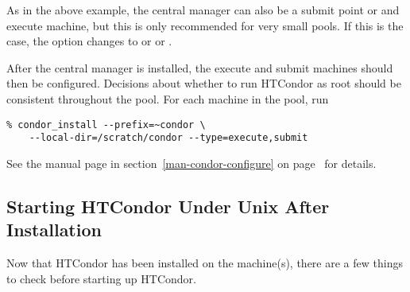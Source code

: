 As in the above example, the central manager can also be a submit
point or and execute machine, but this is only recommended for very
small pools.  If this is the case, the  option changes to
 or   or 
.

After the central manager is installed, the execute and submit machines
should then be configured.  Decisions about whether to run HTCondor as root
should be consistent throughout the pool. For each machine in the pool,
run

\begin{verbatim}
% condor_install --prefix=~condor \
	--local-dir=/scratch/condor --type=execute,submit
\end{verbatim}

See the  manual page in
section~\ref{man-condor-configure} on
page~\pageref{man-condor-configure} for details.


\subsection{\label{installed-now-what}
Starting HTCondor Under Unix After Installation}

Now that HTCondor has been installed on the machine(s), there are a few
things to check before starting up HTCondor.

